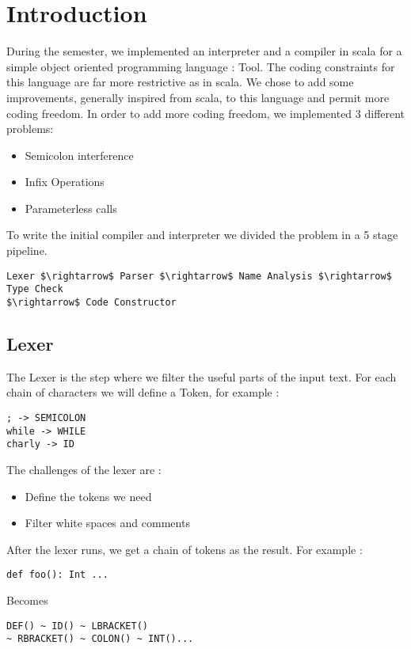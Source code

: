 \section{Introduction}

\textnormal{During the semester, we implemented an interpreter and a compiler in
  scala for a simple object oriented programming language : Tool. The coding
  constraints for this language are far more restrictive as in scala. We chose
  to add some improvements, generally inspired from scala, to this language and
  permit more coding freedom.}
\textnormal{In order to add more coding freedom, we implemented 3 different problems:}

\begin{itemize}
\item Semicolon interference
\item Infix Operations
\item Parameterless calls
\end{itemize}

\textnormal{To write the initial compiler and interpreter we divided the problem
  in a 5 stage pipeline.}

\begin{lstlisting}
Lexer $\rightarrow$ Parser $\rightarrow$ Name Analysis $\rightarrow$ Type Check
$\rightarrow$ Code Constructor
\end{lstlisting}

\subsection{Lexer}
\textnormal{The Lexer is the step where we filter the useful parts of the input
  text. For each chain of characters we will define a Token, for example :}
\vfill
\begin{lstlisting}
; -> SEMICOLON
while -> WHILE
charly -> ID
\end{lstlisting}
\vfill
\textnormal{The challenges of the lexer are :}
\begin{itemize}
\item Define the tokens we need
\item Filter white spaces and comments
\end{itemize}

\textnormal{After the lexer runs, we get a chain of tokens as the result. For
  example :}
\begin{lstlisting}
def foo(): Int ...
\end{lstlisting}
\textmd{Becomes}
\begin{lstlisting}
DEF() ~ ID() ~ LBRACKET() 
~ RBRACKET() ~ COLON() ~ INT()...
\end{lstlisting}

